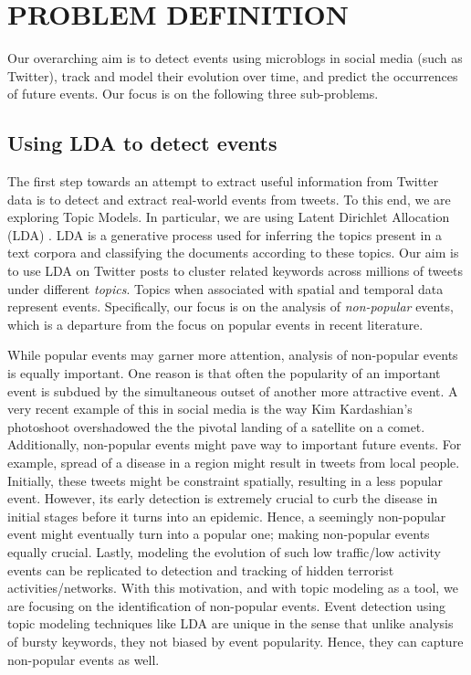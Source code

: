 \section{\uppercase{Problem Definition}}
Our overarching aim is to detect events using microblogs in social media (such as Twitter), track and model their evolution over time, and predict the occurrences of future events. Our focus is on the following three sub-problems.

\subsection{Using LDA to detect events}
The first step towards an attempt to extract useful information from Twitter data is to detect and extract real-world events from tweets. To this end, we are exploring Topic Models. In particular, we are using Latent Dirichlet Allocation (LDA) \cite{blei2003latent}. LDA is a generative process used for inferring the topics present in a text corpora and classifying the documents according to these topics. Our aim is to use LDA on Twitter posts to cluster related keywords across millions of tweets under different \emph{topics}. Topics when associated with spatial and temporal data represent events. Specifically, our focus is on the analysis of \emph{non-popular} events, which is a departure from the focus on popular events in recent literature.

While popular events may garner more attention, analysis of non-popular events is equally important. One reason is that often the popularity of an important event is subdued by the simultaneous outset of another more attractive event. A very recent example of this in social media is the way Kim Kardashian's photoshoot overshadowed the the pivotal landing of a satellite on a comet. Additionally, non-popular events might pave way to important future events. For example, spread of a disease in a region might result in tweets from local people. Initially, these tweets might be constraint spatially, resulting in a less popular event. However, its early detection is extremely crucial to curb the disease in initial stages before it turns into an epidemic. Hence, a seemingly non-popular event might eventually turn into a popular one; making non-popular events equally crucial. Lastly, modeling the evolution of such low traffic/low activity events can be replicated to detection and tracking of hidden terrorist activities/networks. With this motivation, and with topic modeling as a tool, we are focusing on the identification of non-popular events. Event detection using topic modeling techniques like LDA are unique in the sense that unlike analysis of bursty keywords, they not biased by event popularity. Hence, they can capture non-popular events as well.

